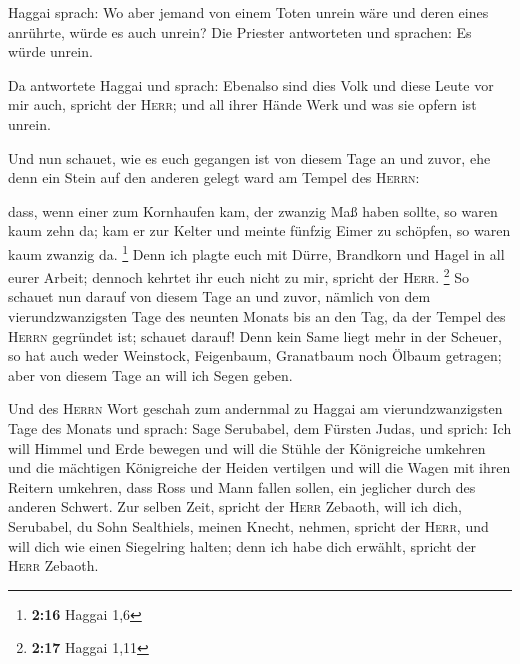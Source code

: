  Haggai sprach: Wo aber jemand von einem Toten unrein
wäre und deren eines anrührte, würde es auch unrein? Die Priester
antworteten und sprachen: Es würde unrein.

 Da antwortete Haggai und sprach: Ebenalso sind dies Volk
und diese Leute vor mir auch, spricht der \textsc{Herr}; und all ihrer
Hände Werk und was sie opfern ist unrein.

 Und nun schauet, wie es euch gegangen ist von diesem
Tage an und zuvor, ehe denn ein Stein auf den anderen gelegt ward am
Tempel des \textsc{Herrn}:

 dass, wenn einer zum Kornhaufen kam, der zwanzig Maß
haben sollte, so waren kaum zehn da; kam er zur Kelter und meinte
fünfzig Eimer zu schöpfen, so waren kaum zwanzig da. \footnote{\textbf{2:16}
  Haggai 1,6}  Denn ich plagte euch mit Dürre, Brandkorn
und Hagel in all eurer Arbeit; dennoch kehrtet ihr euch nicht zu mir,
spricht der \textsc{Herr}. \footnote{\textbf{2:17} Haggai 1,11}
 So schauet nun darauf von diesem Tage an und zuvor,
nämlich von dem vierundzwanzigsten Tage des neunten Monats bis an den
Tag, da der Tempel des \textsc{Herrn} gegründet ist; schauet darauf!
 Denn kein Same liegt mehr in der Scheuer, so hat auch
weder Weinstock, Feigenbaum, Granatbaum noch Ölbaum getragen; aber von
diesem Tage an will ich Segen geben.

 Und des \textsc{Herrn} Wort geschah zum andernmal zu
Haggai am vierundzwanzigsten Tage des Monats und sprach: 
Sage Serubabel, dem Fürsten Judas, und sprich: Ich will Himmel und Erde
bewegen  und will die Stühle der Königreiche umkehren und
die mächtigen Königreiche der Heiden vertilgen und will die Wagen mit
ihren Reitern umkehren, dass Ross und Mann fallen sollen, ein jeglicher
durch des anderen Schwert.  Zur selben Zeit, spricht der
\textsc{Herr} Zebaoth, will ich dich, Serubabel, du Sohn Sealthiels,
meinen Knecht, nehmen, spricht der \textsc{Herr}, und will dich wie
einen Siegelring halten; denn ich habe dich erwählt, spricht der
\textsc{Herr} Zebaoth.
